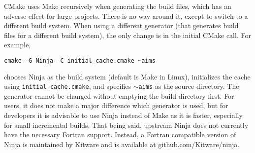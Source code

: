 CMake uses Make recursively when generating the build files, which has an adverse effect for large projects. There is no way around it, except to switch to a different build system. When using a different generator (that generates build files for a different build system), the only change is in the initial CMake call. For example,
\begin{verbatim}
cmake -G Ninja -C initial_cache.cmake ~aims
\end{verbatim}
chooses Ninja as the build system (default is Make in Linux), initializes the cache using \texttt{initial\_cache.cmake}, and specifies $\sim$\texttt{aims} as the source directory. The generator cannot be changed without emptying the build directory first. For users, it does not make a major difference which generator is used, but for developers it is advisable to use Ninja instead of Make as it is faster, especially for small incremental builds. That being said, upstream Ninja does not currently have the necessary Fortran support. Instead, a Fortran compatible version of Ninja is maintained by Kitware and is available at github.com/Kitware/ninja.
